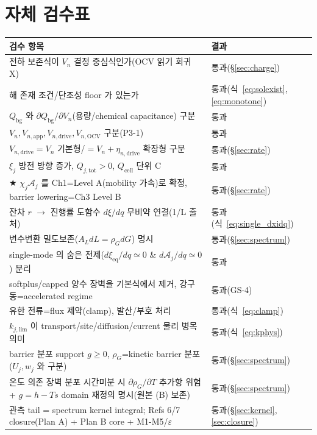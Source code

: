 \documentclass[11pt,a4paper]{article}
\newcommand{\eq}{\mathrm{eq}}
\newcommand{\app}{\mathrm{app}}
\newcommand{\drive}{\mathrm{drive}}
\newcommand{\tot}{\mathrm{tot}}
\newcommand{\bg}{\mathrm{bg}}
\newcommand{\cell}{\mathrm{cell}}
\newcommand{\OCV}{\mathrm{OCV}}
\begin{document}
\section{자체 검수표}\label{sec:selfcheck}
\begin{longtable}{p{} p{}}
\toprule 검수 항목 & 결과 \\ \midrule \endhead
전하 보존식이 $V_n$ 결정 중심식인가(OCV 읽기 회귀 X) & 통과(\S\ref{sec:charge}) \\
해 존재 조건/단조성 floor 가 있는가 & 통과(식~\eqref{eq:solexist},\eqref{eq:monotone}) \\
$Q_\bg$ 와 $\partial Q_\bg/\partial V_n$(용량/chemical capacitance) 구분 & 통과 \\
$V_n,V_{n,\app},V_{n,\drive},V_{n,\OCV}$ 구분(P3-1) & 통과 \\
$V_{n,\drive}=V_n$ 기본형/$=V_n+\eta_{n,\drive}$ 확장형 구분 & 통과(\S\ref{sec:rate}) \\
$\xi_j$ 방전 방향 증가, $Q_{j,\tot}>0$, $Q_\cell$ 단위 C & 통과 \\
★ $\chi_j\mathcal A_j$ 를 Ch1=Level A(mobility 가속)로 확정, barrier lowering=Ch3 Level B & 통과(\S\ref{sec:rate}) \\
잔차 $r$ $\to$ 진행률 도함수 $d\xi/dq$ 무비약 연결(1/L 출처) & 통과(식~\eqref{eq:single_dxidq}) \\
변수변환 밀도보존($A_L dL=\rho_G dG$) 명시 & 통과(\S\ref{sec:spectrum}) \\
single-mode 의 숨은 전제($d\xi_\eq/dq\simeq0$ \& $d\mathcal A_j/dq\simeq0$) 분리 & 통과 \\
softplus/capped 양수 장벽을 기본식에서 제거, 강구동=accelerated regime & 통과(GS-4) \\
유한 전류=flux 제약(clamp), 발산/부호 처리 & 통과(식~\eqref{eq:clamp}) \\
$k_{j,\mathrm{lim}}$ 이 transport/site/diffusion/current 물리 병목 의미 & 통과(식~\eqref{eq:kphys}) \\
barrier 분포 support $g\ge0$, $\rho_G$=kinetic barrier 분포($U_j,w_j$ 와 구분) & 통과(\S\ref{sec:spectrum}) \\
온도 의존 장벽 분포 시간미분 시 $\partial\rho_G/\partial T$ 추가항 위험 + $g=h-Ts$ domain 재정의 명시(원본 (B) 보존) & 통과(\S\ref{sec:spectrum}) \\
관측 tail = spectrum kernel integral; Refs 6/7 closure(Plan A) + Plan B core + M1-M5/$\varepsilon$ & 통과(\S\ref{sec:kernel},\ref{sec:closure}) \\

\end{longtable}
\end{document}
